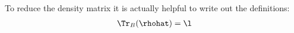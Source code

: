 To reduce the density matrix it is actually helpful to write out the definitions:
\begin{align}
\Tr_B(\rhohat) = \l
\end{align}
